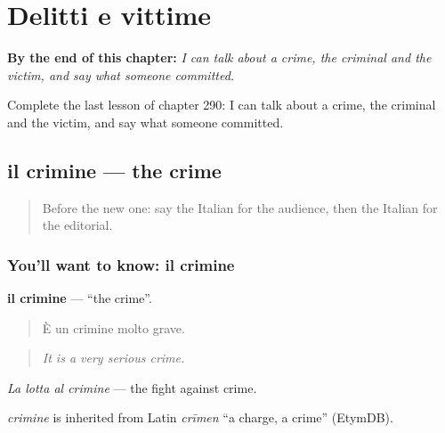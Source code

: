 
\chapter{Delitti e vittime}
\label{ch:it-delitti-e-vittime}

\begin{chapteropening}
\textbf{By the end of this chapter:} \emph{I can talk about a crime, the criminal and the victim, and say what someone committed.}

Complete the last lesson of chapter 290: I can talk about a crime, the criminal and the victim, and say what someone committed.
\end{chapteropening}

\section[il crimine]{il crimine — the crime}

\label{lesson:IT-C290-crimine}



\begin{quote}
Before the new one: say the Italian for the audience, then the Italian for the editorial.
\end{quote}

\subsection*{You'll want to know: il crimine}
\textbf{il crimine} — \textquotedblleft{}the crime\textquotedblright{}.

\begin{quote}
È un crimine molto grave.
\end{quote}

\begin{quote}
\emph{It is a very serious crime.}
\end{quote}

\emph{La lotta al crimine} — the fight against crime.

\begin{cousinweb}
\emph{crimine} is inherited from Latin \emph{crīmen} \textquotedblleft{}a charge, a crime\textquotedblright{} (EtymDB).
\end{cousinweb}

